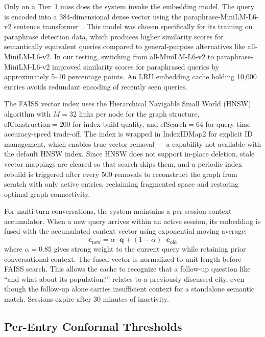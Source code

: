 \documentclass[conference]{IEEEtran}
\begin{document}
Only on a Tier~1 miss does the system invoke the embedding model. The query is encoded into a 384-dimensional dense vector using the paraphrase-MiniLM-L6-v2 sentence transformer~\cite{johnson2021}. This model was chosen specifically for its training on paraphrase detection data, which produces higher similarity scores for semantically equivalent queries compared to general-purpose alternatives like all-MiniLM-L6-v2. In our testing, switching from all-MiniLM-L6-v2 to paraphrase-MiniLM-L6-v2 improved similarity scores for paraphrased queries by approximately 5--10 percentage points. An LRU embedding cache holding 10,000 entries avoids redundant encoding of recently seen queries.

The FAISS vector index uses the Hierarchical Navigable Small World (HNSW) algorithm with $M=32$ links per node for the graph structure, $\text{efConstruction}=200$ for index build quality, and $\text{efSearch}=64$ for query-time accuracy-speed trade-off. The index is wrapped in IndexIDMap2 for explicit ID management, which enables true vector removal --- a capability not available with the default HNSW index. Since HNSW does not support in-place deletion, stale vector mappings are cleared so that search skips them, and a periodic index rebuild is triggered after every 500 removals to reconstruct the graph from scratch with only active entries, reclaiming fragmented space and restoring optimal graph connectivity.

For multi-turn conversations, the system maintains a per-session context accumulator. When a new query arrives within an active session, its embedding is fused with the accumulated context vector using exponential moving average:
\begin{equation}
\mathbf{c}_{\text{new}} = \alpha \cdot \mathbf{q} + (1 - \alpha) \cdot \mathbf{c}_{\text{old}}
\label{eq:ema}
\end{equation}
where $\alpha = 0.85$ gives strong weight to the current query while retaining prior conversational context. The fused vector is normalized to unit length before FAISS search. This allows the cache to recognize that a follow-up question like ``and what about its population?'' relates to a previously discussed city, even though the follow-up alone carries insufficient context for a standalone semantic match. Sessions expire after 30 minutes of inactivity.

\subsection{Per-Entry Conformal Thresholds}
\end{document}
